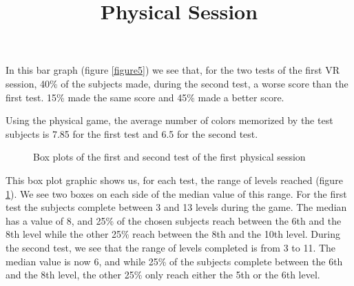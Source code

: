 \documentclass[12pt, openany, twocolumn]{article}
\begin{document}
            In this bar graph (figure \ref{figure5}) we see that, for the two tests of the first VR session, 40\% of the subjects made, during the second test, a worse score than the first test. 
            15\% made the same score and 45\% made a better score.
            \\

            \noindent \title{\textbf{Physical Session}} \vspace{0.25cm}

            Using the physical game, the average number of colors memorized by the test subjects is 7.85 for the first test and 6.5 for the second test.
          
                \begin{figure}[H]
                    \centering
                    \setlength{\fboxsep}{0pt}
                    \caption{Box plots of the first and second test of the first physical session}
                    \label{figure6}
                \end{figure}
        
            This box plot graphic shows us, for each test, the range of levels reached (figure \ref{figure6}).
            We see two boxes on each side of the median value of this range.
            For the first test the subjects complete between 3 and 13 levels during the game. 
            The median has a value of 8, and 25\% of the chosen subjects reach between the 6th and the 8th level while the other 25\% reach between the 8th and the 10th level. 
            During the second test, we see that the range of levels completed is from 3 to 11. 
            The median value is now 6, and while 25\% of the subjects complete between the 6th and the 8th level, the other 25\% only reach either the 5th or the 6th level.
            \\
\end{document}

